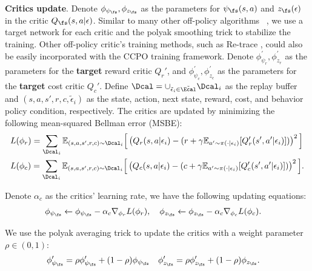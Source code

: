 \textbf{Critics update}. Denote $\phi_{\psi_\fs}, \phi_{z_\fs}$ as the parameters for $\psi_\fs(s, a)$ and $z_{\fs}(\epsilon)$ in the critic $Q_\fs(s, a|\epsilon)$. Similar to many other off-policy algorithms~\cite{lillicrap2015continuous}
, we use a target network for each critic and the polyak smoothing trick to stabilize the training. Other off-policy critic's training methods, such as Re-trace
, could also be easily incorporated with the CCPO training framework. Denote $\phi_{\psi_r}^{\prime}, \phi_{z_r}^{\prime}$ as the parameters for the \textbf{target} reward critic $Q_r'$, and $\phi_{\psi_c}^{\prime}, \phi_{z_c}^{\prime}$ as the parameters for the \textbf{target} cost critic $Q_c'$. Define $\Dcal = \cup_{\tilde{\epsilon}_i \in \tilde{\Ecal}} \Dcal_i$ as the replay buffer and $(s, a, s', r, c, \tilde{\epsilon}_i)$ as the state, action, next state, reward, cost, and behavior policy condition, respectively. The critics are updated by minimizing the following mean-squared Bellman error (MSBE):
\begin{align}
  & L(\phi_r) = \sum_{\Dcal_i} \mathbb{E}_{(s, a, s', r, c) \sim \Dcal_i}\Big[\left( Q_r(s, a|\epsilon_i) -  (r + \gamma \mathbb{E}_{a'\sim \pi(\cdot | \epsilon_i)}[ Q_r'(s', a'|\epsilon_i) ] ) \right)^2 \Big]
  \label{eq:qr_loss}\\
  & L(\phi_c) = \sum_{\Dcal_i} \mathbb{E}_{(s, a, s', r, c) \sim \Dcal_i} \Big[\left( Q_c(s, a|\epsilon_i) -  (c + \gamma \mathbb{E}_{a' \sim \pi(\cdot | \epsilon_i)}[ Q_c'(s', a'|\epsilon_i) ] ) \right)^2 \Big].
  \label{eq:qc_loss}
\end{align}

Denote $\alpha_c$ as the critics' learning rate, we have the following updating equations:
\vspace*{-1mm}
\begin{align}
\label{equ: critics update}
    & \phi_{\psi_\fs} \xleftarrow{} \phi_{\psi_\fs} - \alpha_c \nabla_{\phi_r} L(\phi_r), \quad \phi_{z_\fs} \xleftarrow{} \phi_{z_\fs} - \alpha_c \nabla_{\phi_c} L(\phi_c).
\end{align}

\vspace*{-1mm}
We use the polyak averaging trick to update the critics with a weight parameter $\rho \in (0, 1)$:
\vspace*{-1mm}
\begin{equation}
\begin{aligned}
  &\phi_{\psi_\fs}^{\prime} = \rho \phi_{\psi_\fs}^{\prime} + (1-\rho) \phi_{\psi_\fs} \quad \phi_{z_\fs}^{\prime} = \rho \phi_{z_\fs}^{\prime} + (1-\rho) \phi_{z_\fs}.
\end{aligned}
\label{eq:polyak}
\end{equation}

